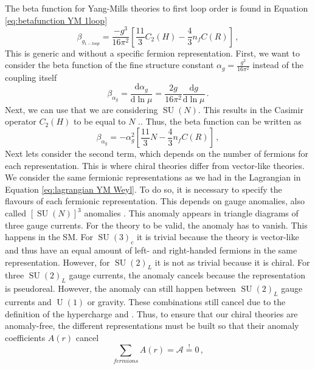 The beta function for Yang-Mills theories to first loop order is found in Equation \ref{eq:betafunction YM 1loop}
\begin{equation}
    \beta_{g_{1-loop}}=\frac{-g^3}{16\pi^2}\left[ \frac{11}{3}C_2(H)-\frac{4}{3}n_fC(R)\right]\,,
\end{equation}
This is generic and without a specific fermion representation. First, we want to consider the beta function of the fine structure constant $\alpha_g=\frac{g^2}{16\pi^2}$ instead of the coupling itself
\begin{equation}
    \beta_{\alpha_g}=\frac{\text{d}\alpha_g}{\text{d}\ln \mu}=\frac{2g}{16\pi^2}\frac{\text{d}g}{\text{d}\ln \mu}\,.
\end{equation}
Next, we can use that we are considering $\operatorname{SU}(N)$. This results in the Casimir operator $C_2(H)$ to be equal to $N$ \cite{Peskin:1995ev}.. Thus, the beta function can be written as
\begin{equation}
    \beta_{\alpha_{g}}={-\alpha_g^2}\left[ \frac{11}{3}N-\frac{4}{3}n_fC(R)\right]\,,
\end{equation}
Next lets consider the second term, which depends on the number of fermions for each representation. This is where chiral theories differ from vector-like theories. We consider the same fermionic representations as we had in the Lagrangian in Equation \ref{eq:lagrangian YM Weyl}. To do so, it is necessary to specify the flavours of each fermionic representation. This depends on gauge anomalies, also called $\left[\operatorname{SU}(N) \right]^3$ anomalies \cite{Peskin:1995ev}. This anomaly appears in triangle diagrams of three gauge currents. For the theory to be valid, the anomaly has to vanish. This happens in the SM. For $\operatorname{SU}(3)_c$ it is trivial because the theory is vector-like and thus have an equal amount of left- and right-handed fermions in the same representation. However, for $\operatorname{SU}(2)_L$ it is not as trivial because it is chiral. For three $\operatorname{SU}(2)_L$ gauge currents, the anomaly cancels because the representation is pseudoreal. However, the anomaly can still happen between $\operatorname{SU}(2)_L$ gauge currents and $\operatorname{U}(1)$ or gravity. These combinations still cancel due to the definition of the hypercharge and  \cite{Peskin:1995ev}. 
Thus, to ensure that our chiral theories are anomaly-free, the different representations must be built so that their anomaly coefficients $A(r)$ cancel
\begin{equation}
    \sum_{fermions}A(r)=\mathcal{A}\overset{!}{=}0\,,
\end{equation}
